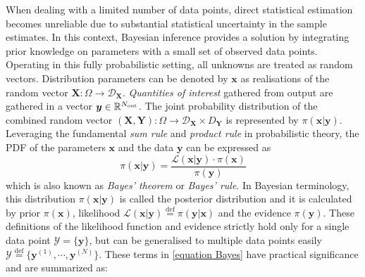 When dealing with a limited number of data points, direct statistical estimation becomes unreliable due to substantial statistical uncertainty in the sample estimates. In this context, Bayesian inference provides a solution by integrating prior knowledge on parameters with a small set of observed data points. Operating in this fully probabilistic setting, all unknowns are treated as random vectors. Distribution parameters can be denoted by $\boldsymbol{x}$ as realisations of the random vector $\boldsymbol{X}:\Omega \rightarrow \mathcal{D}_{\boldsymbol{X}}$. \textit{Quantities of interest} gathered from output are gathered in a vector $\boldsymbol{y} \in \mathbb{R}^{N_{\rm{out}}}$. The joint probability distribution of the combined random vector $(\boldsymbol{X},\boldsymbol{Y}):\Omega \rightarrow \mathcal{D}_{\boldsymbol{X}} \times {D}_{\boldsymbol{Y}}$ is represented by $\pi(\boldsymbol{x}|\boldsymbol{y})$. Leveraging the fundamental \textit{sum rule} and \textit{product rule} in probabilistic theory, the \acrfull{PDF} of the parameters $\boldsymbol{x}$ and the data $\boldsymbol{y}$ can be expressed as
\begin{equation}
\pi(\boldsymbol{x}|\boldsymbol{y}) = \frac{{\mathcal{L}(\boldsymbol{x}|\boldsymbol{y}) \cdot \pi(\boldsymbol{x})}}{{\pi(\boldsymbol{y})}} \label{equation Bayes}
\end{equation}
which is also known as \textit{Bayes' theorem} or \textit{Bayes' rule}. In Bayesian terminology, this distribution $\pi(\boldsymbol{x}|\boldsymbol{y})$ is called the posterior distribution and it is calculated by prior $\pi(\boldsymbol{x})$, likelihood $\mathcal{L}(\boldsymbol{x}|\boldsymbol{y})\stackrel{\mathrm{def}}{=}\pi(\boldsymbol{y}|\boldsymbol{x})$
and the evidence $\pi(\boldsymbol{y})$. These definitions of the likelihood function and evidence strictly hold only for a single data point $\mathcal{Y}=\{\boldsymbol{y} \}$, but can be generalised to multiple data points easily $\mathcal{Y} \stackrel{\mathrm{def}}{=} \{{\boldsymbol{y}^{(1)}},\cdots,{\boldsymbol{y}^{(N)}}\}$. These terms in \cref{equation Bayes} have practical significance and are summarized as:
